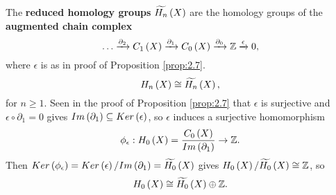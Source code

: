 The \textbf{reduced homology groups} $ \widetilde{H_n}\left( X \right) $ are the homology groups of the \textbf{augmented chain complex}
$$ \dots \xrightarrow{\partial_2} C_1\left( X \right) \xrightarrow{\partial_1} C_0\left( X \right) \xrightarrow{\partial_0} \mathbb{Z} \xrightarrow{\epsilon} 0, $$
where $ \epsilon $ is as in proof of Proposition \ref{prop:2.7}.
$$ H_n\left( X \right) \cong \widetilde{H_n}\left( X \right), $$
for $ n \ge 1 $. Seen in the proof of Proposition \ref{prop:2.7} that $ \epsilon $ is surjective and $ \epsilon \circ \partial_1 = 0 $ gives $ Im\left( \partial_1 \right) \subseteq Ker\left( \epsilon \right) $, so $ \epsilon $ induces a surjective homomorphism
$$ \phi_\epsilon : H_0\left( X \right) = \dfrac{C_0\left( X \right)}{Im\left( \partial_1 \right)} \to \mathbb{Z}. $$
Then $ Ker\left( \phi_\epsilon \right) = Ker\left( \epsilon \right) / Im\left( \partial_1 \right) = \widetilde{H_0}\left( X \right) $ gives $ H_0\left( X \right) / \widetilde{H_0}\left( X \right) \cong \mathbb{Z} $, so
$$ H_0\left( X \right) \cong \widetilde{H_0}\left( X \right) \oplus \mathbb{Z}. $$

